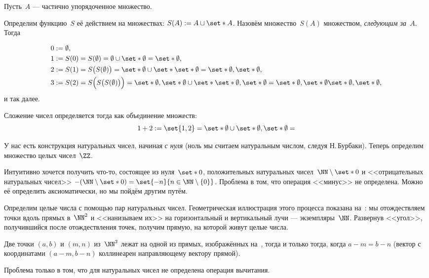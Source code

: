 \newcommand*{\tW}{\widetilde{W}}

Пусть~$A$ --- частично упорядоченное множество.

Определим функцию~$S$ её действием на множествах: $S(A) := A \cup \set*{A}$. Назовём множество~$S(A)$ множеством, \emph{следующим за~$A$}. Тогда

\begin{align*}
	0 &:= \emptyset,
	\\
	1 &:=
	S(0) =
	S(\emptyset) =
	\emptyset \cup \set*{\emptyset} =
	\set*{\emptyset},
	\\
	2 &:= S(1) =
	S \bigl( S(\emptyset) \bigr) =
	\set*{\emptyset} \cup \set*{\set*{\emptyset}} =
	\set*{\emptyset, \set*{\emptyset}},
	\\
	3 &:= S(2) =
	S \Bigl( S \bigl( S(\emptyset) \bigr) \Bigr) =
	\set*{\emptyset, \set*{\emptyset}}
	\cup
	\set*{\set*{\emptyset, \set*{\emptyset}}}
	=
	\set*{
		\emptyset, \set*{\emptyset}
		\set*{\emptyset, \set*{\emptyset}}
	}
	,
\end{align*}
и так далее.

Сложение чисел определяется тогда как объединение множеств:
\[
	1 + 2
	:=
	\set{1, 2} =
	\set*{\emptyset} \cup
	\set*{\emptyset, \set*{\emptyset}}
	=
\]

У нас есть конструкция натуральных чисел, начиная \emph{с нуля} (ноль мы считаем натуральным числом, следуя Н.\,Бурбаки). Теперь определим множество целых чисел~$\ZZ$.

Интуитивно хочется получить что-то, состоящее из нуля~$\set*{0}$, положительных натуральных чисел~$\NN \setminus \set*{0}$ и <<отрицательных натуральных чисел>> $-(\NN\setminus\set*{0}) = \set{-n}{n \in \NN \setminus \{0\}}$. Проблема в том, что операция <<минус>> не определена. Можно её определить аксиоматически, но мы пойдём другим путём.

Определим целые числа с помощью пар натуральных чисел. Геометрическая иллюстрация этого процесса показана на~: мы отождествляем точки вдоль прямых в~$\NN^2$ и <<нанизываем их>> на горизонтальный и вертикальный лучи --- экземпляры~$\NN$. Развернув <<угол>>, получившийся после отождествления точек, получим прямую, на которой живут целые числа.

Две точки $(a, b)$ и $(m, n)$ из~$\NN^2$ лежат на одной из прямых, изображённых на~, тогда и только тогда, когда $a - m = b - n$ (вектор с координатами $(a - m, b - n)$ коллинеарен направляющему вектору прямой).


Проблема только в том, что для натуральных чисел не определена операция вычитания.

